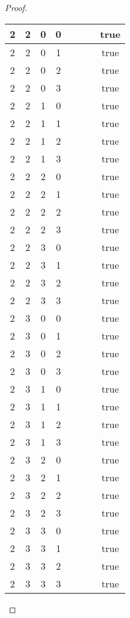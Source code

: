 \documentclass[10pt]{article}
\theoremstyle{definition}
\theoremstyle{plain}
\begin{document}
\begin{proof}
\begin{longtable}{|c|c|c|c|c|c|c|c|}
      2 & 2 & 0 & 0 &  &  &  & true \tabularnewline \hline
      2 & 2 & 0 & 1 &  &  &  & true \tabularnewline \hline
      2 & 2 & 0 & 2 &  &  &  & true \tabularnewline \hline
      2 & 2 & 0 & 3 &  &  &  & true \tabularnewline \hline
      2 & 2 & 1 & 0 &  &  &  & true \tabularnewline \hline
      2 & 2 & 1 & 1 &  &  &  & true \tabularnewline \hline
      2 & 2 & 1 & 2 &  &  &  & true \tabularnewline \hline
      2 & 2 & 1 & 3 &  &  &  & true \tabularnewline \hline
      2 & 2 & 2 & 0 &  &  &  & true \tabularnewline \hline
      2 & 2 & 2 & 1 &  &  &  & true \tabularnewline \hline
      2 & 2 & 2 & 2 &  &  &  & true \tabularnewline \hline
      2 & 2 & 2 & 3 &  &  &  & true \tabularnewline \hline
      2 & 2 & 3 & 0 &  &  &  & true \tabularnewline \hline
      2 & 2 & 3 & 1 &  &  &  & true \tabularnewline \hline
      2 & 2 & 3 & 2 &  &  &  & true \tabularnewline \hline
      2 & 2 & 3 & 3 &  &  &  & true \tabularnewline \hline
      2 & 3 & 0 & 0 &  &  &  & true \tabularnewline \hline
      2 & 3 & 0 & 1 &  &  &  & true \tabularnewline \hline
      2 & 3 & 0 & 2 &  &  &  & true \tabularnewline \hline
      2 & 3 & 0 & 3 &  &  &  & true \tabularnewline \hline
      2 & 3 & 1 & 0 &  &  &  & true \tabularnewline \hline
      2 & 3 & 1 & 1 &  &  &  & true \tabularnewline \hline
      2 & 3 & 1 & 2 &  &  &  & true \tabularnewline \hline
      2 & 3 & 1 & 3 &  &  &  & true \tabularnewline \hline
      2 & 3 & 2 & 0 &  &  &  & true \tabularnewline \hline
      2 & 3 & 2 & 1 &  &  &  & true \tabularnewline \hline
      2 & 3 & 2 & 2 &  &  &  & true \tabularnewline \hline
      2 & 3 & 2 & 3 &  &  &  & true \tabularnewline \hline
      2 & 3 & 3 & 0 &  &  &  & true \tabularnewline \hline
      2 & 3 & 3 & 1 &  &  &  & true \tabularnewline \hline
      2 & 3 & 3 & 2 &  &  &  & true \tabularnewline \hline
      2 & 3 & 3 & 3 &  &  &  & true \tabularnewline \hline


\end{longtable}
\end{proof}
\end{document}
